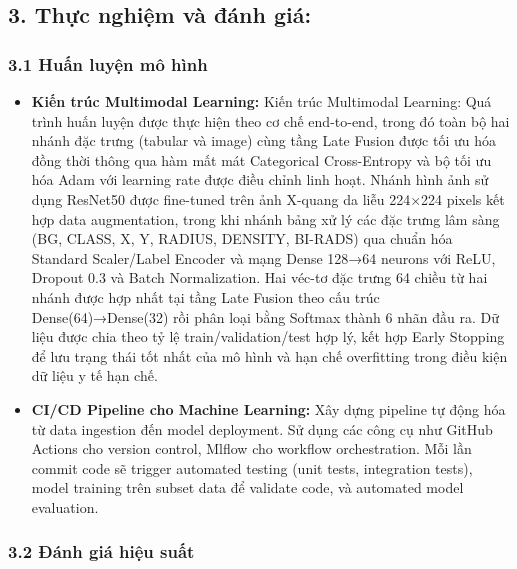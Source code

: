    
   



\subsection{3. Thực nghiệm và đánh giá:} 
\subsubsection{3.1 Huấn luyện mô hình}
 \begin{itemize}
    
    \item \textbf{Kiến trúc Multimodal Learning:  }
    Kiến trúc Multimodal Learning: Quá trình huấn luyện được thực hiện theo cơ chế end-to-end, trong đó toàn bộ hai nhánh đặc trưng (tabular và image) cùng tầng Late Fusion được tối ưu hóa đồng thời thông qua hàm mất mát Categorical Cross-Entropy và bộ tối ưu hóa Adam với learning rate được điều chỉnh linh hoạt. Nhánh hình ảnh sử dụng ResNet50 được fine-tuned trên ảnh X-quang da liễu 224×224 pixels kết hợp data augmentation, trong khi nhánh bảng xử lý các đặc trưng lâm sàng (BG, CLASS, X, Y, RADIUS, DENSITY, BI-RADS) qua chuẩn hóa Standard Scaler/Label Encoder và mạng Dense 128→64 neurons với ReLU, Dropout 0.3 và Batch Normalization. Hai véc-tơ đặc trưng 64 chiều từ hai nhánh được hợp nhất tại tầng Late Fusion theo cấu trúc Dense(64)→Dense(32) rồi phân loại bằng Softmax thành 6 nhãn đầu ra. Dữ liệu được chia theo tỷ lệ train/validation/test hợp lý, kết hợp Early Stopping để lưu trạng thái tốt nhất của mô hình và hạn chế overfitting trong điều kiện dữ liệu y tế hạn chế.
    
    \item \textbf{ CI/CD Pipeline cho Machine Learning: }
    Xây dựng pipeline tự động hóa từ data ingestion đến model deployment. Sử dụng các công cụ như GitHub Actions cho version control, Mlflow cho workflow orchestration. Mỗi lần commit code sẽ trigger automated testing (unit tests, integration tests), model training trên subset data để validate code, và automated model evaluation.

\end{itemize}
\subsubsection{3.2 Đánh giá hiệu suất}

